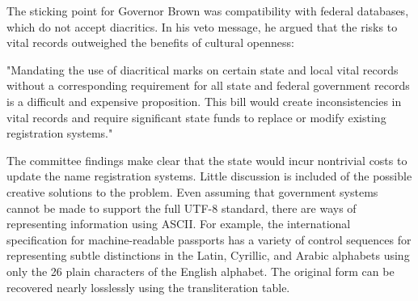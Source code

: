 The sticking point for Governor Brown was compatibility with federal databases,
which do not accept diacritics. In his veto message, he argued that the risks to
vital records outweighed the benefits of cultural openness:

"Mandating the use of diacritical marks on certain state and local vital records
without a corresponding requirement for all state and federal government records
is a difficult and expensive proposition. This bill would create inconsistencies
in vital records and require significant state funds to replace or modify
existing registration systems."

The committee findings make clear that the state would incur nontrivial costs to
update the name registration systems. Little discussion is included of the
possible creative solutions to the problem. Even assuming that government
systems cannot be made to support the full UTF-8 standard, there are ways of
representing information using ASCII. For example, the international
specification for machine-readable passports has a variety of control sequences
for representing subtle distinctions in the Latin, Cyrillic, and Arabic
alphabets using only the 26 plain characters of the English alphabet.  The
original form can be recovered nearly losslessly using the transliteration
table.
